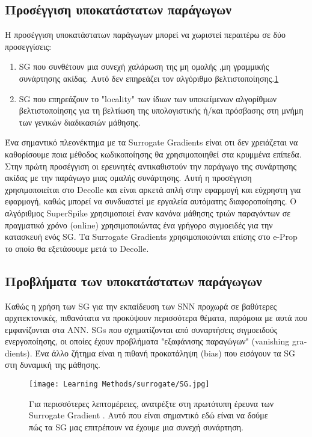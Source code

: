 \documentclass[12pt]{report}
\begin{document}
\subsection{Προσέγγιση υποκατάστατων παράγωγων}
Η προσέγγιση υποκατάστατων παράγωγων μπορεί να χωριστεί περαιτέρω σε δύο προσεγγίσεις:
\begin{enumerate}
    \item \textlatin{SG} που συνθέτουν μια συνεχή χαλάρωση
της μη ομαλής ,μη γραμμικής συνάρτησης ακίδας. Αυτό δεν επηρεάζει τον αλγόριθμο βελτιστοποίησης.\ref{fig:sg}
    \item \textlatin{SG} που επηρεάζουν το "\textlatin{locality}" των ίδιων των υποκείμενων αλγορίθμων βελτιστοποίησης για τη βελτίωση της υπολογιστικής ή/και πρόσβασης στη μνήμη των γενικών διαδικασιών μάθησης.
\end{enumerate}
Ένα σημαντικό πλεονέκτημα με τα \textlatin{Surrogate Gradients} είναι οτι δεν χρειάζεται να καθορίσουμε ποια μέθοδος κωδικοποίησης θα χρησιμοποιηθεί στα κρυμμένα επίπεδα. Στην πρώτη προσέγγιση οι ερευνητές  αντικαθιστούν την παράγωγο της συνάρτησης ακίδας με την παράγωγο μιας ομαλής συνάρτησης. Αυτή η προσέγγιση χρησιμοποιείται στο \textlatin{Decolle} και είναι αρκετά απλή στην εφαρμογή και εύχρηστη για εφαρμογή, καθώς μπορεί να συνδυαστεί με εργαλεία αυτόματης διαφοροποίησης. Ο αλγόριθμος \textlatin{SuperSpike} χρησιμοποιεί έναν κανόνα μάθησης τριών παραγόντων σε πραγματικό χρόνο (\textlatin{online}) χρησιμοποιώντας ένα γρήγορο σιγμοειδές για την κατασκευή ενός \textlatin{SG}. Τα \textlatin{Surrogate Gradients} χρησιμοποιούνται επίσης στο \textlatin{e-Prop} το οποίο θα εξετάσουμε μετά το \textlatin{Decolle}.
\subsection{Προβλήματα των υποκατάστατων παράγωγων}

Καθώς η χρήση των \textlatin{SG} για την εκπαίδευση των \textlatin{SNN} προχωρά σε βαθύτερες αρχιτεκτονικές, πιθανότατα να προκύψουν περισσότερα θέματα, παρόμοια με αυτά που εμφανίζονται στα \textlatin{ANN}. \textlatin{SGs} που σχηματίζονται από συναρτήσεις σιγμοειδούς ενεργοποίησης, οι οποίες έχουν προβλήματα "εξαφάνισης παραγώγων" (\textlatin{vanishing gradients}). Ένα άλλο ζήτημα είναι η πιθανή προκατάληψη (\textlatin{bias}) που εισάγουν τα \textlatin{SG} στη δυναμική της μάθησης.

\begin{figure}[htp]
    \centering
    \texttt{[image: Learning Methods/surrogate/SG.jpg]}
    \caption{Για περισσότερες λεπτομέρειες, ανατρέξτε στη πρωτότυπη έρευνα των \textlatin{Surrogate Gradient} \cite{neft2019}. Αυτό που είναι σημαντικό εδώ είναι να δούμε πώς τα \textlatin{SG} μας επιτρέπουν να έχουμε μια συνεχή συνάρτηση.}
    \label{fig:sg}
\end{figure}
\end{document}
